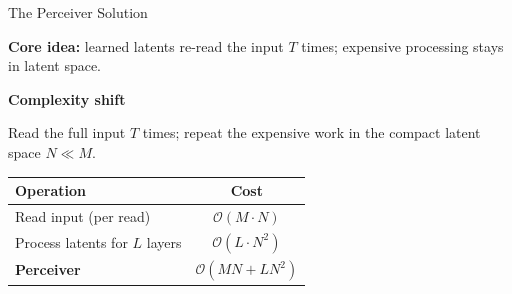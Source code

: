\documentclass[aspectratio=169,11pt]{beamer}
\begin{document}
\begin{frame}[shrink=5]{The Perceiver Solution}
  \small
  \begin{center}
    \begin{minipage}{0.88\textwidth}
      \centering
      {\color{UnifiBlue}\textbf{Core idea:}} learned latents re-read the input $T$ times; expensive processing stays in latent space.
    \end{minipage}
  \end{center}

  \vspace{0.80em}
  \noindent
  \begin{minipage}[t]{0.29\textwidth}
  \end{minipage}\hfill
  \begin{minipage}[t]{0.29\textwidth}
  \end{minipage}\hfill
  \begin{minipage}[t]{0.29\textwidth}
  \end{minipage}

  \vspace{0.22em}
  \begin{center}
    {\color{UnifiDark}\bfseries Complexity shift}

    \vspace{0.18em}
    {\footnotesize Read the full input $T$ times; repeat the expensive work in the compact latent space $N \ll M$.}

    \vspace{0.24em}
    \scriptsize
    \renewcommand{\arraystretch}{1.04}
    \begin{tabular*}{0.66\textwidth}{@{\extracolsep{\fill}}lc}
      \toprule
      \textbf{Operation} & \textbf{Cost} \\
      \midrule
      Read input (per read) & $\mathcal{O}(M \cdot N)$ \\
      Process latents for $L$ layers & $\mathcal{O}(L \cdot N^2)$ \\
      \midrule
      \textbf{Perceiver} & $\mathcal{O}(M N + L N^2)$ \\
      \bottomrule
    \end{tabular*}
  \end{center}
\end{frame}
\end{document}
